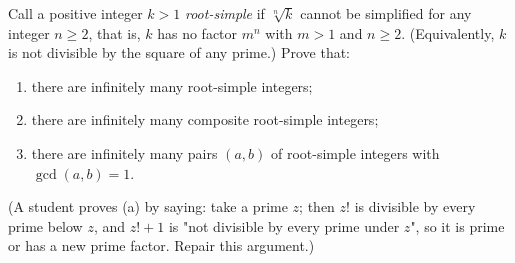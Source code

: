 Call a positive integer $k>1$ \emph{root-simple} if $\sqrt[n]{k}$ cannot be simplified for any integer $n\ge2$, that is, $k$ has no factor $m^n$ with $m>1$ and $n\ge2$. (Equivalently, $k$ is not divisible by the square of any prime.) Prove that:
\begin{enumerate}
\item[(a)] there are infinitely many root-simple integers;
\item[(b)] there are infinitely many composite root-simple integers;
\item[(c)] there are infinitely many pairs $(a,b)$ of root-simple integers with $\gcd(a,b)=1$.
\end{enumerate}
(A student proves (a) by saying: take a prime $z$; then $z!$ is divisible by every prime below $z$, and $z!+1$ is "not divisible by every prime under $z$", so it is prime or has a new prime factor. Repair this argument.)
